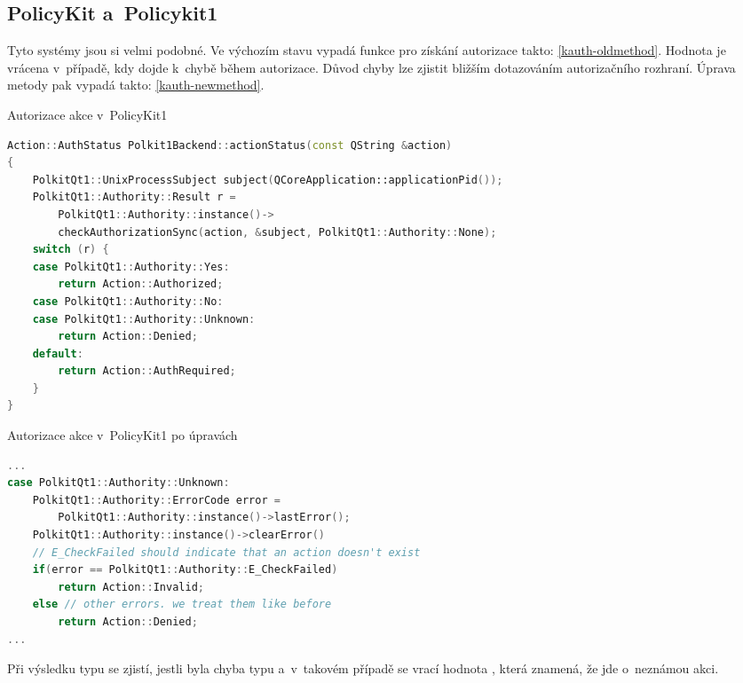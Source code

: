 \subsection*{PolicyKit a~Policykit1}
Tyto systémy jsou si velmi podobné. Ve výchozím stavu vypadá funkce pro získání autorizace takto: \ref{kauth-oldmethod}. Hodnota  je vrácena v~případě, kdy dojde k~chybě během autorizace. Důvod chyby lze zjistit bližším dotazováním autorizačního rozhraní. Úprava metody pak vypadá takto: \ref{kauth-newmethod}.
\begin{mylisting}
\caption{Autorizace akce v~PolicyKit1}
\label{kauth-oldmethod}
\begin{lstlisting}[language=C++]
Action::AuthStatus Polkit1Backend::actionStatus(const QString &action)
{
    PolkitQt1::UnixProcessSubject subject(QCoreApplication::applicationPid());
    PolkitQt1::Authority::Result r =
        PolkitQt1::Authority::instance()->
        checkAuthorizationSync(action, &subject, PolkitQt1::Authority::None);
    switch (r) {
    case PolkitQt1::Authority::Yes:
        return Action::Authorized;
    case PolkitQt1::Authority::No:
    case PolkitQt1::Authority::Unknown:
        return Action::Denied;
    default:
        return Action::AuthRequired;
    }
}
\end{lstlisting}
\end{mylisting}
\begin{mylisting}
\caption{Autorizace akce v~PolicyKit1 po úpravách}
\label{kauth-newmethod}
\begin{lstlisting}[language=C++]
...
case PolkitQt1::Authority::Unknown:
    PolkitQt1::Authority::ErrorCode error =
        PolkitQt1::Authority::instance()->lastError();
    PolkitQt1::Authority::instance()->clearError()
    // E_CheckFailed should indicate that an action doesn't exist
    if(error == PolkitQt1::Authority::E_CheckFailed)
        return Action::Invalid;
    else // other errors. we treat them like before
        return Action::Denied;
...
\end{lstlisting}
\end{mylisting}
Při výsledku typu  se zjistí, jestli byla chyba typu  a~v~takovém případě se vrací hodnota , která znamená, že jde o~neznámou akci.
